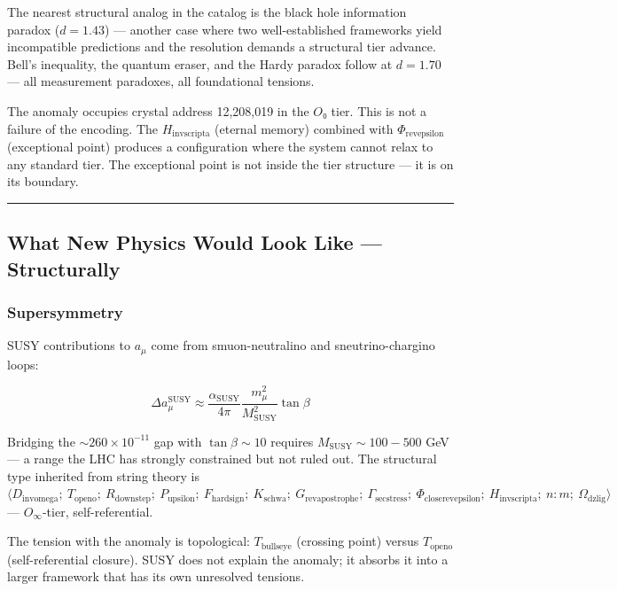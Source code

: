 \documentclass[12pt,a4paper]{article}
\begin{document}
The nearest structural analog in the catalog is the black hole information paradox ($d = 1.43$) --- another case where two well-established frameworks yield incompatible predictions and the resolution demands a structural tier advance. Bell's inequality, the quantum eraser, and the Hardy paradox follow at $d = 1.70$ --- all measurement paradoxes, all foundational tensions.

The anomaly occupies crystal address 12,208,019 in the $O₀$ tier. This is not a failure of the encoding. The $H_{\text{invscripta}}$ (eternal memory) combined with $\Phi_{\text{revepsilon}}$ (exceptional point) produces a configuration where the system cannot relax to any standard tier. The exceptional point is not inside the tier structure --- it is on its boundary.

\begin{center}
\rule{0.5\textwidth}{0.4pt}
\end{center}

\subsection{What New Physics Would Look Like --- Structurally}

\subsubsection{Supersymmetry}

SUSY contributions to $a_{\mu}$ come from smuon-neutralino and sneutrino-chargino loops:

\[\Delta a_{\mu}^{\text{SUSY}} \approx \frac{\alpha_{\text{SUSY}}}{4\pi} \frac{m_{\mu}^2}{M_{\text{SUSY}}^2} \tan\beta\]

Bridging the $\sim 260 \times 10^{-11}$ gap with $\tan\beta \sim 10$ requires $M_{\text{SUSY}} \sim 100-500$ GeV --- a range the LHC has strongly constrained but not ruled out. The structural type inherited from string theory is $\langle D_{\text{invomega}};\ T_{\text{openo}};\ R_{\text{downstep}};\ P_{\text{upsilon}};\ F_{\text{hardsign}};\ K_{\text{schwa}};\ G_{\text{revapostrophe}};\ \Gamma_{\text{secstress}};\ \Phi_{\text{closerevepsilon}};\ H_{\text{invscripta}};\ n{:}m;\ \Omega_{\text{dzlig}} \rangle$ --- $O_{\infty}$-tier, self-referential.

The tension with the anomaly is topological: $T_{\text{bullseye}}$ (crossing point) versus $T_{\text{openo}}$ (self-referential closure). SUSY does not explain the anomaly; it absorbs it into a larger framework that has its own unresolved tensions.
\end{document}
